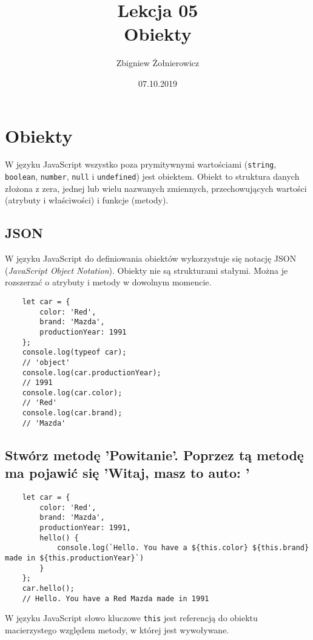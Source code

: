 \documentclass[a4paper]{article}
\begin{document}
\title{{\huge Lekcja 05} \\
    {\Large Obiekty}}
\author{Zbigniew Żołnierowicz}
\date{07.10.2019}
\maketitle
\section{Obiekty}
W języku JavaScript wszystko poza prymitywnymi wartościami ({\tt string}, {\tt boolean}, {\tt number}, {\tt null} i {\tt undefined}) jest obiektem. Obiekt to struktura danych złożona z zera, jednej lub wielu nazwanych zmiennych, przechowujących wartości (atrybuty i właściwości) i funkcje (metody).

\subsection*{JSON}
W języku JavaScript do definiowania obiektów wykorzystuje się notację JSON (\emph{JavaScript Object Notation}). Obiekty nie są strukturami stałymi. Można je rozszerzać o atrybuty i metody w dowolnym momencie.
\begin{verbatim}
    let car = {
        color: 'Red',
        brand: 'Mazda',
        productionYear: 1991
    };
    console.log(typeof car);
    // 'object'
    console.log(car.productionYear);
    // 1991
    console.log(car.color);
    // 'Red'
    console.log(car.brand);
    // 'Mazda'
\end{verbatim}
\pagebreak
\subsection*{Stwórz metodę 'Powitanie'. Poprzez tą metodę ma pojawić się 'Witaj, masz to auto: '}
\begin{verbatim}
    let car = {
        color: 'Red',
        brand: 'Mazda',
        productionYear: 1991,
        hello() {
            console.log(`Hello. You have a ${this.color} ${this.brand} made in ${this.productionYear}`)
        }
    };
    car.hello();
    // Hello. You have a Red Mazda made in 1991
\end{verbatim}
W języku JavaScript słowo kluczowe {\tt this} jest referencją do obiektu macierzystego względem metody, w której jest wywoływane.
\end{document}
